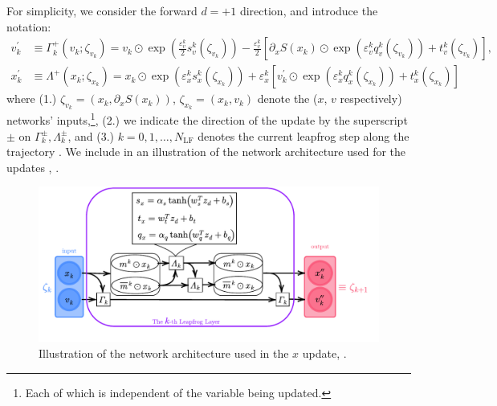 \documentclass{article} %
\begin{document}
For simplicity, we consider the forward \(d=+1\) direction, and introduce the notation:
%
\begin{align}
   v^{\prime}_{k} &\equiv \Gamma^{+}_{k}(v_{k};\zeta_{v_{k}})
   = v_{k}\odot \exp{\left(\tfrac{\varepsilon^{k}_{v}}{2}s_{v}^{k}(\zeta_{v_{k}})\right)} -
   \tfrac{\varepsilon^{k}_{v}}{2}{\left[\partial_{x}S(x_{k})\odot\exp{\left(\varepsilon^{k}_{v} q_{v}^{k}(\zeta_{v_{k}})\right)}
      +t_{v}^{k}(\zeta_{v_{k}})\right]},\label{eq:new_momentum_update}\\
   x^{\prime}_{k} &\equiv \Lambda^{+}(x_{k};\zeta_{x_{k}})
   = x_{k}\odot\exp(\varepsilon^{k}_{x} s^{k}_{x}(\zeta_{x_{k}}))
   + \varepsilon^{k}_{x}\left[v^{\prime}_{k}\odot\exp(\varepsilon^{k}_{x} q^{k}_{x}(\zeta_{x_{k}}))
         + t^{k}_{x}(\zeta_{x_{k}})\right]\label{eq:new_position_update}
\end{align}
%
where (1.) \(\zeta_{v_{k}} = (x_{k}, \partial_{x}S(x_{k}))\), \(\zeta_{x_{k}} = (x_{k}, v_{k})\) denote the (\(x\),
\(v\) respectively) networks' inputs,\footnote{%
   Each of which is independent of the variable being updated.
}, (2.) we indicate the direction of the update by the superscript \(\pm\) on \(\Gamma^{\pm}_{k},
\Lambda^{\pm}_{k}\), and (3.) \(k=0,1,\ldots,N_{\mathrm{LF}}\) denotes the current leapfrog step along the trajectory .
%
We include in  an illustration of the network architecture used for the updates , .
%
\begin{figure}[htpb]
   \centering
   \includegraphics[width=\textwidth]{figures/network8.pdf}
   \caption{\label{fig:network}Illustration of the network architecture used in the \(x\) update, .}
\end{figure}
\end{document}
